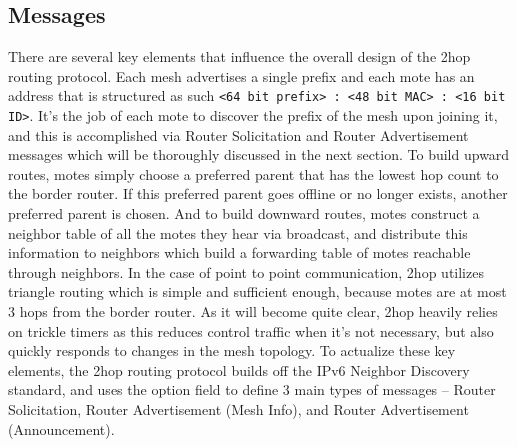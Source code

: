 \subsection{Messages}
There are several key elements that influence the overall design of the 2hop routing protocol.
Each mesh advertises a single prefix and each mote has an address that is structured as such \texttt{<64 bit prefix> : <48 bit MAC> : <16 bit ID>}.
It's the job of each mote to discover the prefix of the mesh upon joining it, and this is accomplished via Router Solicitation and Router Advertisement messages which will be thoroughly discussed in the next section.
To build upward routes, motes simply choose a preferred parent that has the lowest hop count to the border router.
If this preferred parent goes offline or no longer exists, another preferred parent is chosen.
And to build downward routes, motes construct a neighbor table of all the motes they hear via broadcast, and distribute this information to neighbors which build a forwarding table of motes reachable through neighbors.
In the case of point to point communication, 2hop utilizes triangle routing which is simple and sufficient enough, because motes are at most 3 hops from the border router.
As it will become quite clear, 2hop heavily relies on trickle timers as this reduces control traffic when it's not necessary, but also quickly responds to changes in the mesh topology.
To actualize these key elements, the 2hop routing protocol builds off the IPv6 Neighbor Discovery standard, and uses the option field to define 3 main types of messages -- Router Solicitation, Router Advertisement (Mesh Info), and Router Advertisement (Announcement).

